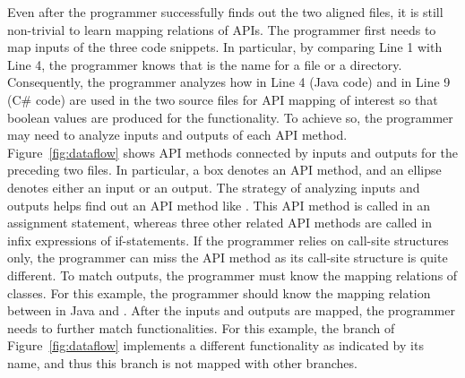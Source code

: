 Even after the programmer successfully finds out the two aligned files, it is still
non-trivial to learn mapping relations of APIs. The programmer first
needs to map inputs of the three code snippets. In particular, by
comparing Line 1 with Line 4, the programmer knows that
 is the name for a file or a directory. Consequently,
the programmer analyzes how  in Line 4 (Java code) and
 in Line 9 (C\# code) are used in the two source files
for API mapping of interest so that boolean values are produced for
the functionality. To achieve so, the programmer may need to analyze
inputs and outputs of each API method. Figure~\ref{fig:dataflow}
shows API methods connected by inputs and outputs for the preceding
two files. In particular, a box denotes an API method, and an
ellipse denotes either an input or an output. The strategy of
analyzing inputs and outputs helps find out an API method like
. This API method is called in
an assignment statement, whereas three other related API methods are
called in infix expressions of if-statements. If the programmer
relies on call-site structures only, the programmer can miss the API
method as its call-site structure is quite different. To match
outputs, the programmer must know the mapping relations of classes.
For this example, the programmer should know the mapping relation
between  in Java and . After
the inputs and outputs are mapped, the programmer needs to further
match functionalities. For this example, the 
branch of Figure~\ref{fig:dataflow} implements a different
functionality as indicated by its name, and thus this branch is not
mapped with other branches.

